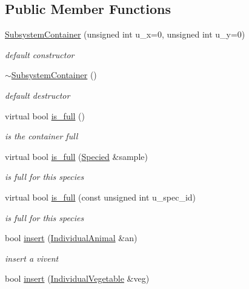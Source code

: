 \subsection*{Public Member Functions}
\begin{DoxyCompactItemize}
\item 
\hyperlink{classSubsystemContainer_ababfc3a959c6fab15c8613ad744e31d5}{SubsystemContainer} (unsigned int u\_\-x=0, unsigned int u\_\-y=0)
\begin{DoxyCompactList}\small\item\em default constructor \end{DoxyCompactList}\item 
\hypertarget{classSubsystemContainer_a96ff687276c5b911c83056367e4aa5d7}{
\hyperlink{classSubsystemContainer_a96ff687276c5b911c83056367e4aa5d7}{$\sim$SubsystemContainer} ()}
\label{classSubsystemContainer_a96ff687276c5b911c83056367e4aa5d7}

\begin{DoxyCompactList}\small\item\em default destructor \end{DoxyCompactList}\item 
virtual bool \hyperlink{classSubsystemContainer_abad57ab248735fded65abacb908a1b7c}{is\_\-full} ()
\begin{DoxyCompactList}\small\item\em is the container full \end{DoxyCompactList}\item 
virtual bool \hyperlink{classSubsystemContainer_ad3c757166da9538df858c550813124b0}{is\_\-full} (\hyperlink{classSpecied}{Specied} \&sample)
\begin{DoxyCompactList}\small\item\em is full for this species \end{DoxyCompactList}\item 
virtual bool \hyperlink{classSubsystemContainer_af1f07b97e8efbca22267479d68344783}{is\_\-full} (const unsigned int u\_\-spec\_\-id)
\begin{DoxyCompactList}\small\item\em is full for this species \end{DoxyCompactList}\item 
bool \hyperlink{classSubsystemContainer_a2d3ef6a5d11bc8744cdb3d98ba563056}{insert} (\hyperlink{classIndividualAnimal}{IndividualAnimal} \&an)
\begin{DoxyCompactList}\small\item\em insert a vivent \end{DoxyCompactList}\item 
\hypertarget{classSubsystemContainer_ae5575faff44dead9dada0cd8c95feef7}{
bool \hyperlink{classSubsystemContainer_ae5575faff44dead9dada0cd8c95feef7}{insert} (\hyperlink{classIndividualVegetable}{IndividualVegetable} \&veg)}
\label{classSubsystemContainer_ae5575faff44dead9dada0cd8c95feef7}


\end{DoxyCompactItemize}
